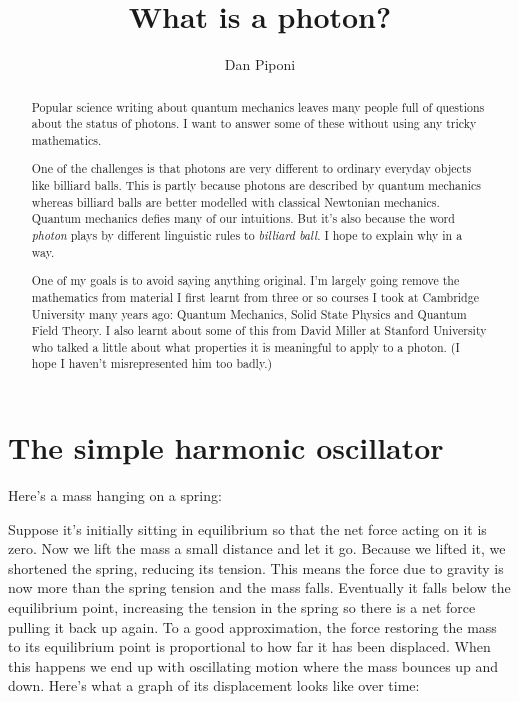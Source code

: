 \documentclass[a4paper]{article}
\title{What is a photon?}
\author{Dan Piponi}
\begin{document}
\maketitle

\begin{abstract}
Popular science writing about quantum mechanics leaves many people full of questions about the status of photons.
I want to answer some of these without using any tricky mathematics.

One of the challenges is that photons are very different to ordinary everyday objects like billiard balls.
This is partly because photons are described by quantum mechanics whereas billiard balls are better modelled with classical Newtonian mechanics.
Quantum mechanics defies many of our intuitions.
But it's also because the word {\em photon} plays by different linguistic rules to {\em billiard ball}.
I hope to explain why in a way.

One of my goals is to avoid saying anything original.
I'm largely going remove the mathematics from material I first learnt from three or so courses I took at Cambridge University many years ago: Quantum Mechanics, Solid State Physics and Quantum Field Theory.
I also learnt about some of this from David Miller at Stanford University who talked a little about what properties it is meaningful to apply to a photon.
(I hope I haven't misrepresented him too badly.)
\end{abstract}

\section{The simple harmonic oscillator}

Here's a mass hanging on a spring:

\begin{center}
\end{center}

Suppose it's initially sitting in equilibrium so that the net force acting on it is zero.
Now we lift the mass a small distance and let it go.
Because we lifted it, we shortened the spring, reducing its tension.
This means the force due to gravity is now more than the spring tension and the mass falls.
Eventually it falls below the equilibrium point, increasing the tension in the spring so there is a net force pulling it back up again.
To a good approximation, the force restoring the mass to its equilibrium point is proportional to how far it has been displaced.
When this happens we end up with oscillating motion where the mass bounces up and down.
Here's what a graph of its displacement looks like over time:
\end{document}
